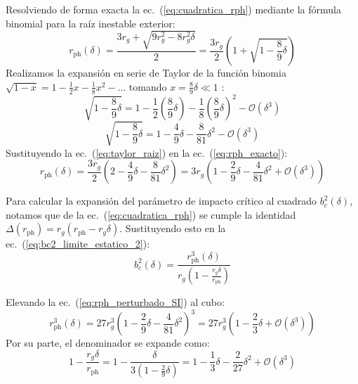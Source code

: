 Resolviendo de forma exacta la ec.~(\ref{eq:cuadratica_rph}) mediante la fórmula binomial para la raíz inestable exterior:
\begin{equation}
    r_{\mathrm{ph}}(\delta) = \frac{3 r_g + \sqrt{9 r_g^2 - 8 r_g^2 \delta}}{2} = \frac{3 r_g}{2} \left( 1 + \sqrt{1 - \frac{8}{9}\delta} \right)
    \label{eq:rph_exacto}
\end{equation}
Realizamos la expansión en serie de Taylor de la función binomia $\sqrt{1 - x} = 1 - \frac{1}{2}x - \frac{1}{8}x^2 - \dots$ tomando $x = \frac{8}{9}\delta \ll 1$ \citep{prueba_bh_cargado}:
\begin{equation}
    \sqrt{1 - \frac{8}{9}\delta} = 1 - \frac{1}{2}\left(\frac{8}{9}\delta\right) - \frac{1}{8}\left(\frac{8}{9}\delta\right)^2 - \mathcal{O}(\delta^3)
    \label{eq:taylor_paso1}
\end{equation}
\begin{equation}
    \sqrt{1 - \frac{8}{9}\delta} = 1 - \frac{4}{9}\delta - \frac{8}{81}\delta^2 - \mathcal{O}(\delta^3)
    \label{eq:taylor_raiz}
\end{equation}
Sustituyendo la ec.~(\ref{eq:taylor_raiz}) en la ec.~(\ref{eq:rph_exacto}):
\begin{equation}
    r_{\mathrm{ph}}(\delta) = \frac{3 r_g}{2} \left( 2 - \frac{4}{9}\delta - \frac{8}{81}\delta^2 \right) = 3 r_g \left( 1 - \frac{2}{9}\delta - \frac{4}{81}\delta^2 + \mathcal{O}(\delta^3) \right)
    \label{eq:rph_perturbado_SI}
\end{equation}

Para calcular la expansión del parámetro de impacto crítico al cuadrado $b_c^2(\delta)$, notamos que de la ec.~(\ref{eq:cuadratica_rph}) se cumple la identidad $\Delta(r_{\mathrm{ph}}) = r_g (r_{\mathrm{ph}} - r_g \delta)$. Sustituyendo esto en la ec.~(\ref{eq:bc2_limite_estatico_2}):
\begin{equation}
    b_c^2(\delta) = \frac{r_{\mathrm{ph}}^3(\delta)}{r_g \left( 1 - \frac{r_g \delta}{r_{\mathrm{ph}}} \right)}
    \label{eq:bc2_relacion_simplificada}
\end{equation}

Elevando la ec.~(\ref{eq:rph_perturbado_SI}) al cubo:
\begin{equation}
    r_{\mathrm{ph}}^3(\delta) = 27 r_g^3 \left( 1 - \frac{2}{9}\delta - \frac{4}{81}\delta^2 \right)^3 = 27 r_g^3 \left( 1 - \frac{2}{3}\delta + \mathcal{O}(\delta^3) \right)
    \label{eq:rph_cubo}
\end{equation}
Por su parte, el denominador se expande como:
\begin{equation}
    1 - \frac{r_g \delta}{r_{\mathrm{ph}}} = 1 - \frac{\delta}{3\left(1 - \frac{2}{9}\delta\right)} = 1 - \frac{1}{3}\delta - \frac{2}{27}\delta^2 + \mathcal{O}(\delta^3)
    \label{eq:denominador_exp}
\end{equation}


